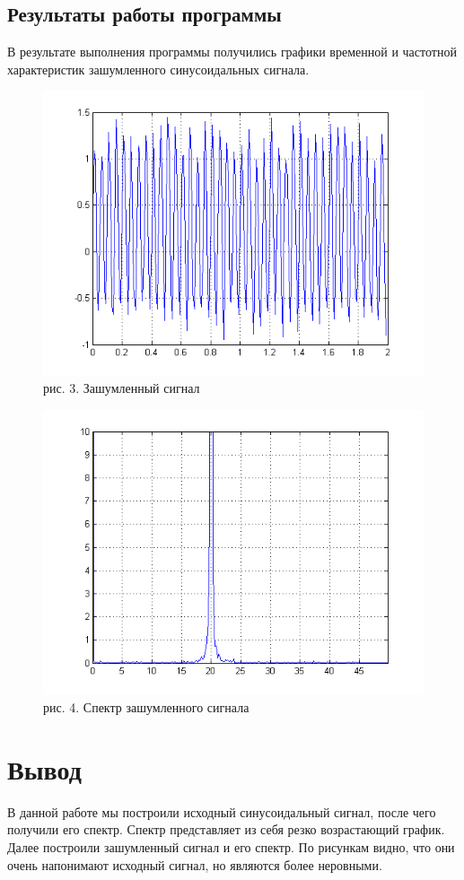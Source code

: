 \documentclass[10pt,a4paper]{report}
\begin{document}
\section{Результаты работы программы}
В результате выполнения программы получились графики временной и частотной характеристик зашумленного синусоидальных сигнала. \newpage

\begin{figure}
\begin{center}
\includegraphics[angle=0, scale = 0.9]{3.png}\newline
рис. 3. Зашумленный сигнал\newline
\end{center}
\begin{center}
\includegraphics[angle=0, scale = 0.9]{4.png}\newline
рис. 4. Спектр зашумленного сигнала\newline
\end{center}
\end{figure}
\chapter{Вывод}
В данной работе мы построили исходный синусоидальный сигнал, после чего получили его спектр. Спектр представляет из себя резко возрастающий график. Далее построили зашумленный сигнал и его спектр. По рисункам видно, что они очень напонимают исходный сигнал, но являются более неровными.
\end{document}
